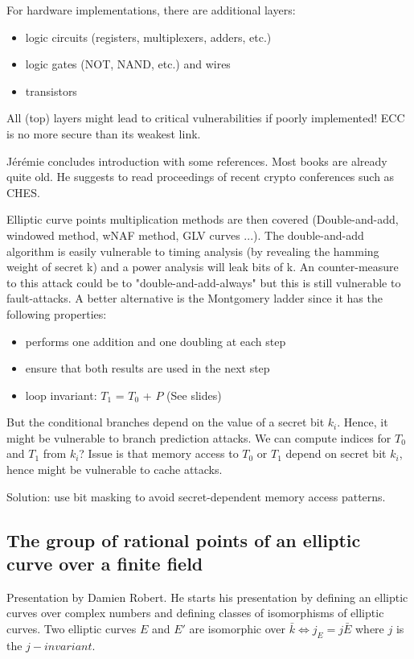 \documentclass[11pt]{article}
\begin{document}
For hardware implementations, there are additional layers:
\begin{itemize}
	\item logic circuits (registers, multiplexers, adders, etc.)
	\item logic gates (NOT, NAND, etc.) and wires
	\item transistors
\end{itemize}

All (top) layers might lead to critical vulnerabilities if poorly implemented! ECC is no more secure than its weakest link.

Jérémie concludes introduction with some references. Most books are already quite old. He suggests to read proceedings of recent crypto conferences such as CHES.

Elliptic curve points multiplication methods are then covered (Double-and-add, windowed method, wNAF method, GLV curves ...). The double-and-add algorithm is easily vulnerable to timing analysis (by revealing the hamming weight of secret k) and a power analysis will leak bits of k. An counter-measure to this attack could be to "double-and-add-always" but this is still vulnerable to fault-attacks. A better alternative is the Montgomery ladder since it has the following properties: 
\begin{itemize}
	\item performs one addition and one doubling at each step
	\item ensure that both results are used in the next step
	\item loop invariant: $T_1$ = $T_0$ + $P$ (See slides)
\end{itemize}

But the conditional branches depend on the value of a secret bit $k_i$. Hence, it might be vulnerable to branch prediction attacks. We can compute indices for $T_0$ and $T_1$ from $k_i$? Issue is that memory access to $T_0$ or $T_1$ depend on secret bit $k_i$, hence might be vulnerable to cache attacks.

Solution: use bit masking to avoid secret-dependent memory access patterns.

\subsection{The group of rational points of an elliptic curve over a finite field}
Presentation by Damien Robert. He starts his presentation by defining an elliptic curves over complex numbers and defining classes of isomorphisms of elliptic curves. Two elliptic curves $E$ and $E'$ are isomorphic over $\bar{k} \iff j_{E} = j{\bar{E}}$ where $j$ is the $j-invariant$.
\end{document}
